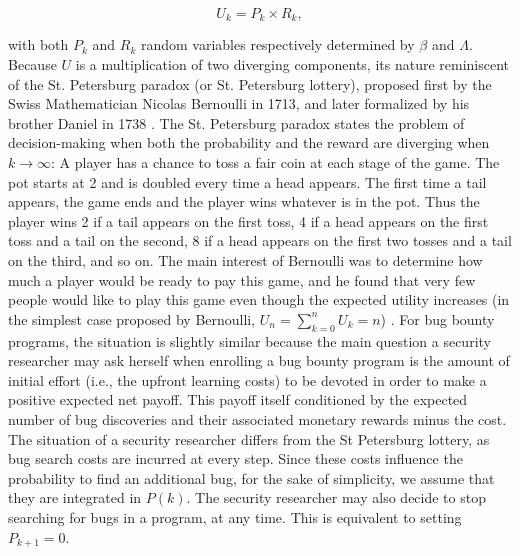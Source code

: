 \begin{equation}
\label{ }
U_k = P_k \times R_k,
\end{equation}

\noindent with both $P_k$ and $R_k$ random variables respectively determined by $\beta$ and $\Lambda$. Because $U$ is a multiplication of two diverging components, its nature reminiscent of the St. Petersburg paradox (or St. Petersburg lottery), proposed first by the Swiss Mathematician Nicolas Bernoulli in 1713, and later formalized by his brother Daniel in 1738 \cite{bernoulli1954exposition}.  The St. Petersburg paradox states the problem of decision-making when both the probability and the reward are diverging when $k \rightarrow \infty$: A player has a chance to toss a fair coin at each stage of the game. The pot starts at 2 and is doubled every time a head appears. The first time a tail appears, the game ends and the player wins whatever is in the pot. Thus the player wins 2 if a tail appears on the first toss, 4 if a head appears on the first toss and a tail on the second, 8 if a head appears on the first two tosses and a tail on the third, and so on. The main interest of Bernoulli was to determine how much a player would be ready to pay this game, and he found that very few people would like to play this game even though the expected utility increases  (in the simplest case proposed by Bernoulli, $U_n = \sum_{k=0}^{n} U_k = n$) \cite{bernoulli1954exposition}. For bug bounty programs, the situation is slightly similar because the main question a security researcher may ask herself when enrolling a bug bounty program is the amount of initial effort (i.e., the upfront learning costs) to be devoted in order to make a positive expected net payoff. This payoff itself conditioned by the expected number of bug discoveries and their associated monetary rewards minus the cost. The situation of a security researcher differs from the St Petersburg lottery, as bug search costs are incurred at every step. Since these costs influence the probability to find an additional bug, for the sake of simplicity, we assume that they are integrated in $P(k)$. The security researcher may also decide to stop searching for bugs in a program, at any time. This is equivalent to setting $P_{k+1} = 0$.\\

